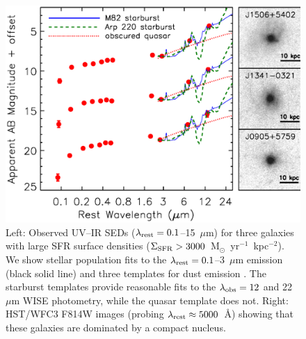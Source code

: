 \documentclass[apj]{emulateapj}
\newcommand{\units}{M$_{\odot}$~yr$^{-1}$~kpc$^{-2}$}
\newcommand{\lrest}{\lambda_{\textnormal{\scriptsize{rest}}}}
\newcommand{\lobs}{\lambda_{\textnormal{\scriptsize{obs}}}}
\newcommand{\sigmasfr}{\Sigma_{\textnormal{\scriptsize{SFR}}}}
\begin{document}
\begin{figure}[!t]
\includegraphics[angle=0,scale=0.41]{3seds.ps}
\caption{Left: Observed UV--IR SEDs ($\lrest=0.1$--15~$\mu$m) for
  three galaxies with large SFR surface densities
  ($\sigmasfr>3000$~\units).  We show stellar population fits to the
  $\lrest=0.1$--3~$\mu$m emission (black solid line) and three
  templates for dust emission \citep[M82 starburst, Arp 220 starburst,
    and obscured quasar;][]{pol07}.  The starburst templates provide
  reasonable fits to the $\lobs=12$ and 22~$\mu$m WISE photometry,
  while the quasar template does not.  Right: HST/WFC3 F814W images
  (probing $\lrest\approx5000$~\AA) showing that these galaxies are
  dominated by a compact nucleus.}
\label{fig:seds}
\end{figure}
\end{document}
